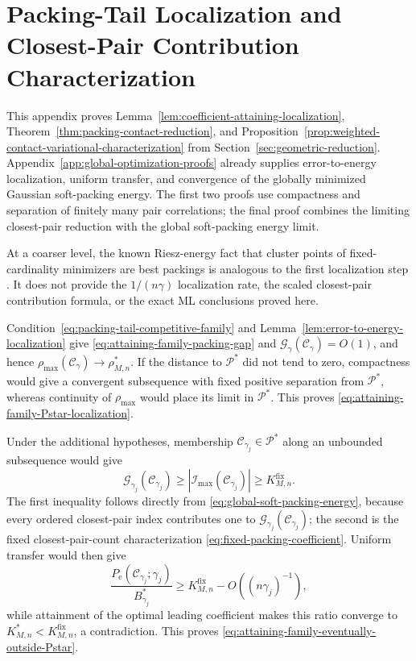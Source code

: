 \documentclass[12pt,draftclsnofoot,onecolumn]{IEEEtran}
\newcommand{\cC}{\mathcal{C}}
\newcommand{\cG}{\mathcal{G}}
\newcommand{\cI}{\mathcal{I}}
\newcommand{\cP}{\mathcal{P}}
\newcommand{\Pe}{P_{\mathrm e}}
\theoremstyle{definition}
\begin{document}
\section{Packing-Tail Localization and Closest-Pair Contribution
Characterization}
\label{app:local-reduction-proofs}

This appendix proves
Lemma~\ref{lem:coefficient-attaining-localization},
Theorem~\ref{thm:packing-contact-reduction}, and
Proposition~\ref{prop:weighted-contact-variational-characterization}
from Section~\ref{sec:geometric-reduction}.
Appendix~\ref{app:global-optimization-proofs}
already supplies error-to-energy localization, uniform transfer, and
convergence of the globally minimized Gaussian soft-packing energy.  The first two proofs
use compactness and separation of finitely many pair correlations; the
final proof combines the limiting closest-pair reduction with the global
soft-packing energy limit.

At a coarser level, the known Riesz-energy fact that cluster points of
fixed-cardinality minimizers are best packings is analogous to the first
localization step \cite[Prop.~2]{BondarenkoHardinSaff2014}.  It does not
provide the \(1/(n\gamma)\) localization rate, the scaled closest-pair
contribution formula, or the exact ML conclusions proved here.

\begin{IEEEproof}
Condition~\eqref{eq:packing-tail-competitive-family} and
Lemma~\ref{lem:error-to-energy-localization} give
\eqref{eq:attaining-family-packing-gap} and
\(\cG_\gamma(\cC_\gamma)=O(1)\), and hence
\(\rho_{\max}(\cC_\gamma)\to\rho^{\ast}_{M,n}\).  If the distance to
\(\cP^{\ast}\) did not tend to zero, compactness would give a
convergent subsequence with fixed positive separation from
\(\cP^{\ast}\), whereas continuity of \(\rho_{\max}\) would place its
limit in \(\cP^{\ast}\).  This proves
\eqref{eq:attaining-family-Pstar-localization}.

Under the additional hypotheses, membership
\(\cC_{\gamma_j}\in\cP^{\ast}\) along an unbounded subsequence would
give
\begin{equation*}
  \cG_{\gamma_j}(\cC_{\gamma_j})
  \ge |\cI_{\max}(\cC_{\gamma_j})|
  \ge K^{\mathrm{fix}}_{M,n}.
\end{equation*}
The first inequality follows directly from
\eqref{eq:global-soft-packing-energy}, because every ordered closest-pair
index contributes one to \(\cG_{\gamma_j}(\cC_{\gamma_j})\); the second is the fixed closest-pair-count characterization
\eqref{eq:fixed-packing-coefficient}.
Uniform transfer would then give
\begin{equation*}
  \frac{\Pe(\cC_{\gamma_j};\gamma_j)}{B_{\gamma_j}^{\ast}}
  \ge K^{\mathrm{fix}}_{M,n}-O((n\gamma_j)^{-1}),
\end{equation*}
while attainment of the optimal leading coefficient makes this ratio converge to
\(K^{\ast}_{M,n}<K^{\mathrm{fix}}_{M,n}\), a contradiction.
This proves \eqref{eq:attaining-family-eventually-outside-Pstar}.
\end{IEEEproof}
\end{document}
